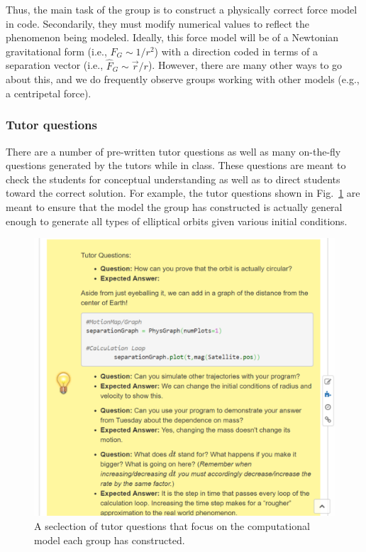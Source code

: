 \documentclass{msuphddissertation}
\begin{document}
\begin{doublespace}
Thus, the main task of the group is to construct a physically correct force model in code.  Secondarily, they must modify numerical values to reflect the phenomenon being modeled.  Ideally, this force model will be of a Newtonian gravitational form (i.e., $F_{G}\sim1/r^{2}$) with a direction coded in terms of a separation vector (i.e., $\hat{F}_{G}\sim\vec{r}/r$).  However, there are many other ways to go about this, and we do frequently observe groups working with other models (e.g., a centripetal force).

\subsubsection{Tutor questions}\label{CH3:TutorQuestions}

There are a number of pre-written tutor questions as well as many on-the-fly questions generated by the tutors while in class.  These questions are meant to check the students for conceptual understanding as well as to direct students toward the correct solution.  For example, the tutor questions shown in Fig.~\ref{CH3:TutorQuestion} are meant to ensure that the model the group has constructed is actually general enough to generate all types of elliptical orbits given various initial conditions.

\begin{figure}[ht]\centering
\includegraphics[scale=0.5]{images/CH3TutorQuestion.pdf}
\caption{A seclection of tutor questions that focus on the computational model each group has constructed.}\label{CH3:TutorQuestion}
\end{figure}


\end{doublespace}
\end{document}
